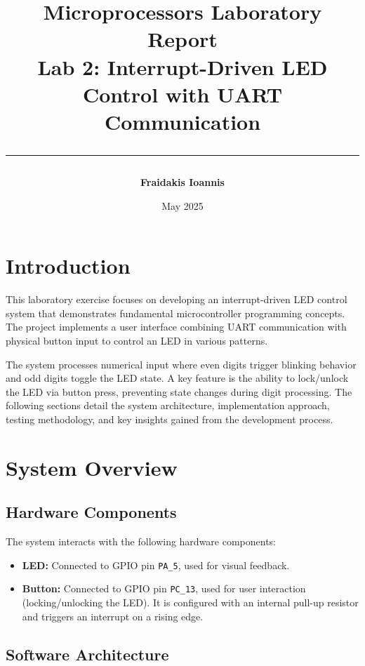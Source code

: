 \documentclass[12pt,a4paper]{article}
\title{
    \vspace*{2cm}
    \Huge\textbf{\textsf{Microprocessors Laboratory Report}}\\
    \vspace{0.4cm}
    \Large\textsf{Lab 2: Interrupt-Driven LED Control with UART Communication}
    \vspace{1cm}
    \rule{\textwidth}{1pt}
}
\author{
    \Large\begin{tabular}{rl}
        \textbf{Fraidakis Ioannis}\\
    \end{tabular}
}
\date{\Large\textsf{May 2025}}
\begin{document}
\maketitle

\section{Introduction}

\begin{tcolorbox}[mybox]
This laboratory exercise focuses on developing an interrupt-driven LED control system that demonstrates fundamental microcontroller programming concepts. The project implements a user interface combining UART communication with physical button input to control an LED in various patterns.

The system processes numerical input where even digits trigger blinking behavior and odd digits toggle the LED state. A key feature is the ability to lock/unlock the LED via button press, preventing state changes during digit processing. 
The following sections detail the system architecture, implementation approach, testing methodology, and key insights gained from the development process.
\end{tcolorbox}

\section{System Overview}

\subsection{Hardware Components}
The system interacts with the following hardware components:


\begin{tcolorbox}[mybox]
\begin{itemize}[label=\textcolor{myblue}{$\bullet$}, itemsep=1.5mm]
    \item \textbf{LED:} Connected to GPIO pin \texttt{PA\_5}, used for visual feedback.
    \item \textbf{Button:} Connected to GPIO pin \texttt{PC\_13}, used for user interaction (locking/unlocking the LED). It is configured with an internal pull-up resistor and triggers an interrupt on a rising edge.
\end{itemize}
\end{tcolorbox}

\subsection{Software Architecture}
\end{document}
